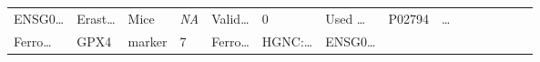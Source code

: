 \documentclass[
]{article}
\begin{document}
\begin{longtable}[]{@{}lllllllllllllll@{}}
\begin{minipage}[t]{0.05\columnwidth}
ENSG0\ldots{}\strut
\end{minipage} & \begin{minipage}[t]{0.05\columnwidth}\raggedright
Erast\ldots{}\strut
\end{minipage} & \begin{minipage}[t]{0.04\columnwidth}\raggedright
Mice\strut
\end{minipage} & \begin{minipage}[t]{0.05\columnwidth}\raggedright
\emph{NA}\strut
\end{minipage} & \begin{minipage}[t]{0.05\columnwidth}\raggedright
Valid\ldots{}\strut
\end{minipage} & \begin{minipage}[t]{0.05\columnwidth}\raggedright
0\strut
\end{minipage} & \begin{minipage}[t]{0.05\columnwidth}\raggedright
Used \ldots{}\strut
\end{minipage} & \begin{minipage}[t]{0.05\columnwidth}\raggedright
P02794\strut
\end{minipage} & \begin{minipage}[t]{0.02\columnwidth}\raggedright
\ldots{}\strut
\end{minipage}\tabularnewline
\begin{minipage}[t]{0.05\columnwidth}\raggedright
Ferro\ldots{}\strut
\end{minipage} & \begin{minipage}[t]{0.04\columnwidth}\raggedright
GPX4\strut
\end{minipage} & \begin{minipage}[t]{0.04\columnwidth}\raggedright
marker\strut
\end{minipage} & \begin{minipage}[t]{0.02\columnwidth}\raggedright
7\strut
\end{minipage} & \begin{minipage}[t]{0.05\columnwidth}\raggedright
Ferro\ldots{}\strut
\end{minipage} & \begin{minipage}[t]{0.05\columnwidth}\raggedright
HGNC:\ldots{}\strut
\end{minipage} & \begin{minipage}[t]{0.05\columnwidth}\raggedright
ENSG0\ldots{}\strut
\end{minipage} & \begin{minipage}[t]{0.05\columnwidth}\raggedright

\end{minipage}
\end{longtable}
\end{document}
